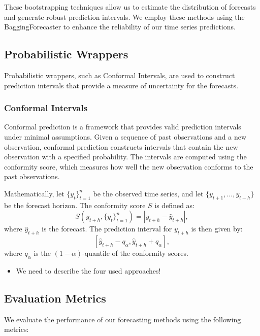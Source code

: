 \documentclass{article}
\begin{document}
These bootstrapping techniques allow us to estimate the distribution of forecasts and generate robust prediction intervals. We employ these methods using the BaggingForecaster to enhance the reliability of our time series predictions.


\subsection{Probabilistic Wrappers}
Probabilistic wrappers, such as Conformal Intervals, are used to construct prediction intervals that provide a measure of uncertainty for the forecasts.

\subsubsection{Conformal Intervals}
Conformal prediction is a framework that provides valid prediction intervals under minimal assumptions. Given a sequence of past observations and a new observation, conformal prediction constructs intervals that contain the new observation with a specified probability. The intervals are computed using the conformity score, which measures how well the new observation conforms to the past observations.

Mathematically, let \( \{ y_t \}_{t=1}^n \) be the observed time series, and let \( \{ y_{t+1}, \ldots, y_{t+h} \} \) be the forecast horizon. The conformity score \( S \) is defined as:
\begin{equation}
S(y_{t+h}, \{ y_t \}_{t=1}^n) = | y_{t+h} - \hat{y}_{t+h} |,
\end{equation}
where \( \hat{y}_{t+h} \) is the forecast. The prediction interval for \( y_{t+h} \) is then given by:
\begin{equation}
\left[ \hat{y}_{t+h} - q_\alpha, \hat{y}_{t+h} + q_\alpha \right],
\end{equation}
where \( q_\alpha \) is the \( (1 - \alpha) \)-quantile of the conformity scores. 

\begin{itemize}
    \item We need to describe the four used approaches!
\end{itemize}

\subsection{Evaluation Metrics}
We evaluate the performance of our forecasting methods using the following metrics:
\end{document}
